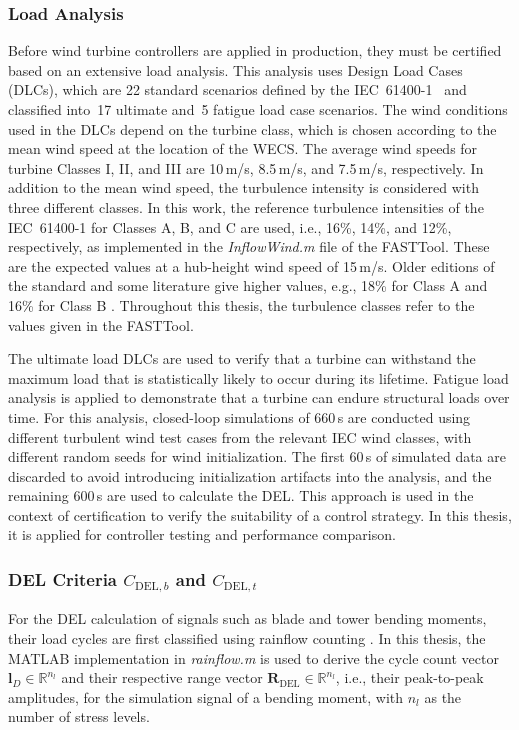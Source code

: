 \subsubsection{Load Analysis}
Before wind turbine controllers are applied in production, they must be certified based on an extensive load analysis. This analysis uses Design Load Cases (DLCs), which are 22 standard scenarios defined by the IEC~61400-1~\cite{IEC61400-1} and classified into~17 ultimate and~5 fatigue load case scenarios. The wind conditions used in the DLCs depend on the turbine class, which is chosen according to the mean wind speed at the location of the WECS. The average wind speeds for turbine Classes I, II, and III are 10\,m/s, 8.5\,m/s, and 7.5\,m/s, respectively. In addition to the mean wind speed, the turbulence intensity is considered with three different classes. In this work, the reference turbulence intensities of the IEC~61400-1 for Classes A, B, and C are used, i.e., 16\%, 14\%, and 12\%, respectively, as implemented in the \textit{InflowWind.m} file of the FASTTool. These are the expected values at a hub-height wind speed of 15\,m/s. Older editions of the standard and some literature give higher values, e.g., 18\% for Class A and 16\% for Class B \cite{gasch2011wind}. Throughout this thesis, the turbulence classes refer to the values given in the FASTTool.

The ultimate load DLCs are used to verify that a turbine can withstand the maximum load that is statistically likely to occur during its lifetime. Fatigue load analysis is applied to demonstrate that a turbine can endure structural loads over time. For this analysis, closed-loop simulations of 660\,s are conducted using different turbulent wind test cases from the relevant IEC wind classes, with different random seeds for wind initialization. The first 60\,s of simulated data are discarded to avoid introducing initialization artifacts into the analysis, and the remaining 600\,s are used to calculate the DEL. This approach is used in the context of certification to verify the suitability of a control strategy. In this thesis, it is applied for controller testing and performance comparison.


\subsubsection{DEL Criteria $C_{\text{DEL},b}$ and $C_{\text{DEL},t}$}

For the DEL calculation of signals such as blade and tower bending moments, their load cycles are first classified using rainflow counting \cite{matsuishi1968fatigue}. In this thesis, the MATLAB implementation in \textit{rainflow.m} is used to derive the cycle count vector $\bm{l}_D \in \mathbb{R}^{n_l }$ and their respective range vector $\bm{R}_{\text{DEL}}\in \mathbb{R}^{n_l }$, i.e., their peak-to-peak amplitudes, for the simulation signal of a bending moment, with $n_l$ as the number of stress levels. 


